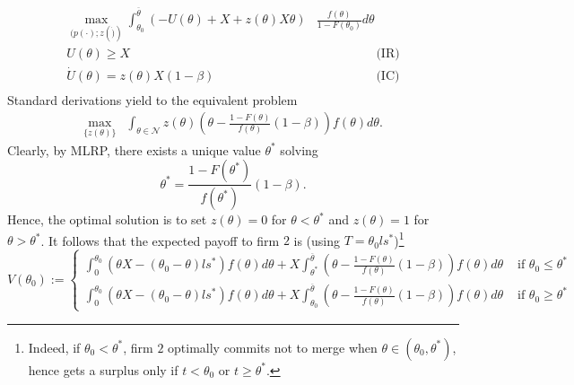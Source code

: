\documentclass[a4paper]{article}
\newcommand{\N}{\mathcal N}
\renewcommand{\t}{\theta}
\renewcommand{\b}{\beta}
\begin{document}
\begin{align*}
  \max_{(p(\cdot);z(\dot))} \int_{\t_0}^{\overline \t} \left(-U(\t)+X+z(\t)X\t \right)&\frac{f(\t)}{1-F(\t_0)}d\t\\ 
  U(\t) \geq X & \hspace{2cm} \text{(IR)} \\ 
  \dot{U}(\t)=z(\t)X(1-\b) & \hspace{2cm} \text{(IC)} \\ 
\end{align*}
%
Standard derivations yield to the equivalent problem 
%
\begin{align*}
\max_{\{z(\t)\}} &\int_{\t\in \N}z(\t)\left( \t-\frac{1-F(\t)}{f(\t)}(1-\b)\right)f(\t)d\t.
\end{align*}
%
Clearly, by MLRP, there exists a unique value $\t^*$ solving
%
\[
\t^*=\frac{1-F(\t^*)}{f(\t^*)}(1-\b).
\]
%
Hence, the optimal solution is to set $z(\t)=0$ for $\t<\t^*$ and $z(\t)=1$ for $\t>\t^*$. It follows that the expected payoff to firm $2$ is (using $T=\t_0 l s^*$)\footnote{
  Indeed, if $\t_0<\t^*$, firm $2$ optimally commits not to merge when $\theta\in (\t_0,\t^*)$, hence gets a surplus only if $t< \t_0$ or $t\geq \t^*$.
}
%
\begin{equation}\label{eq:V-t0}
  V(\t_0):=\begin{cases}
    \int_0^{\t_0} (\t X-(\t_0-\t)ls^*)f(\t)d\t +X \int_{\t^*}^{\overline \t}\left(\t-\frac{1-F(\t)}{f(\t)}(1-\b)\right)f(\t)d\t & \text{ if } \t_0\leq\t^*\\ 
    \int_0^{\t_0}(\t X-(\t_0-\t)ls^*)f(\t)d\t +X \int_{\t_0}^{\overline \t}\left(\t-\frac{1-F(\t)}{f(\t)}(1-\b)\right)f(\t)d\t & \text{ if } \t_0\geq\t^*
  \end{cases}
\end{equation}
\end{document}
